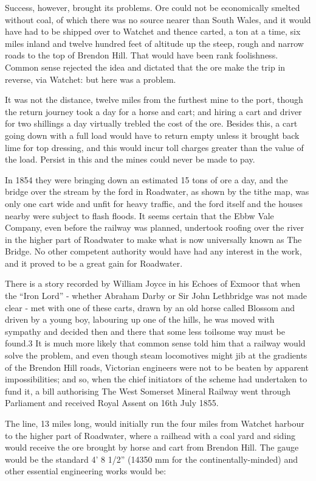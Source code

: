 \documentclass[11pt]{book}
\begin{document}
Success, however, brought its problems. Ore could not be economically smelted without coal, of which there was no source nearer than South Wales, and it would have had to be shipped over to Watchet and thence carted, a ton at a time, six miles inland  and  twelve hundred feet of altitude up the steep, rough and narrow roads to the top of Brendon Hill. That would have been rank foolishness. Common sense rejected the idea and dictated that the ore make the trip in reverse, via Watchet: but here was a problem.

It was not the distance, twelve miles from the furthest mine to the port, though the return journey took a day for a horse and cart; and hiring a cart and driver for two shillings a day virtually trebled the cost of the ore. Besides this, a cart going down with a full load would have to return empty unless it brought back lime for top dressing, and this would incur toll charges greater than the value of the load. Persist in this and the mines could never be made to pay.

In 1854 they were bringing down an estimated 15 tons of ore a day, and the bridge over the stream by the ford in Roadwater, as shown by the tithe map, was only one cart wide and unfit for heavy traffic, and the ford itself and the houses nearby were subject to flash floods. It seems certain that the Ebbw Vale Company,   even before the railway was planned, undertook roofing  over the river in the higher part of Roadwater to make what is now universally known as The Bridge. No other competent authority would have had any interest in the work, and it proved to be a great gain for Roadwater.

There is a story recorded by William Joyce in his Echoes of Exmoor  that when the “Iron Lord” - whether Abraham Darby or Sir John Lethbridge was not made clear -  met with one of these carts, drawn by an old horse called Blossom and driven by a young boy, labouring up one of the hills, he was moved with sympathy and decided then and there that some less toilsome way must be found.3  It is much more likely that common sense told him that a railway would solve the problem, and even though steam locomotives might jib at the gradients of the Brendon Hill roads, Victorian engineers were not to be beaten by apparent impossibilities; and so, when the chief initiators of the scheme had undertaken to fund it, a bill authorising The West Somerset Mineral Railway went through Parliament and received Royal Assent on 16th July 1855.

The line, 13 miles long, would initially run the four miles from Watchet harbour to the higher part of Roadwater, where a railhead with a coal yard and siding would receive the ore brought by horse and cart from Brendon Hill. The gauge would be the standard 4’ 8 1/2” (14350 mm for the continentally-minded) and other essential engineering works would be:
\end{document}
